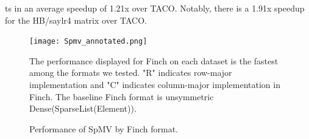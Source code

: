 ts in an average speedup of 1.21x over TACO. Notably, there is a 1.91x speedup for the HB/saylr4 matrix over TACO. 






\begin{figure}
    \texttt{[image: Spmv\_annotated.png]}
    \vspace{-18pt}
    \caption{Performance of SpMV by Finch format.}
    \label{fig:spmv_grouped}
    \footnotesize The performance displayed for Finch on each dataset is the fastest among the formats we tested. "R" indicates row-major implementation and "C" indicates column-major implementation in Finch. The baseline Finch format is unsymmetric Dense(SparseList(Element)).
\end{figure}

